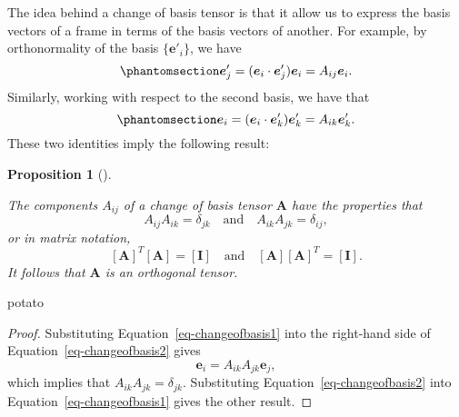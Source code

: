 \documentclass[
  letterpaper,
  DIV=11,
  numbers=noendperiod]{scrreprt}
\theoremstyle{plain}
\newtheorem{proposition}{Proposition}[chapter]
\theoremstyle{remark}
\begin{document}
The idea behind a change of basis tensor is that it allow us to express
the basis vectors of a frame in terms of the basis vectors of another.
For example, by orthonormality of the basis \(\{{\boldsymbol{e}}'_i\}\),
we have \begin{equation}\phantomsection\label{eq-changeofbasis1}{
  {\boldsymbol{e}}'_j = ({\boldsymbol{e}}_i\cdot{\boldsymbol{e}}'_j){\boldsymbol{e}}_i = A_{ij}{\boldsymbol{e}}_i.
}\end{equation} Similarly, working with respect to the second basis, we
have that \begin{equation}\phantomsection\label{eq-changeofbasis2}{
  {\boldsymbol{e}}_i = ({\boldsymbol{e}}_i\cdot{\boldsymbol{e}}'_k){\boldsymbol{e}}'_k = A_{ik}{\boldsymbol{e}}'_k.
}\end{equation} These two identities imply the following result:

\begin{proposition}[]\protect\hypertarget{prp-orthogonalitybasischange}{}\label{prp-orthogonalitybasischange}

The components \(A_{ij}\) of a change of basis tensor
\({\boldsymbol{A}}\) have the properties that
\[A_{ij}A_{ik}=\delta_{jk}\quad\text{and}\quad A_{ik}A_{jk} =\delta_{ij},\]
or in matrix notation,
\[[{\boldsymbol{A}}]^T[{\boldsymbol{A}}] = [{\boldsymbol{I}}]\quad\text{and}\quad [{\boldsymbol{A}}][{\boldsymbol{A}}]^T = [{\boldsymbol{I}}].\]
It follows that \({\boldsymbol{A}}\) is an orthogonal tensor.

\end{proposition}

potato

\begin{proof}
Substituting Equation~\ref{eq-changeofbasis1} into the right-hand side
of Equation~\ref{eq-changeofbasis2} gives
\[{\boldsymbol{e}}_i = A_{ik}A_{jk}{\boldsymbol{e}}_j,\] which implies
that \(A_{ik}A_{jk}=\delta_{jk}\). Substituting
Equation~\ref{eq-changeofbasis2} into Equation~\ref{eq-changeofbasis1}
gives the other result.
\end{proof}
\end{document}
